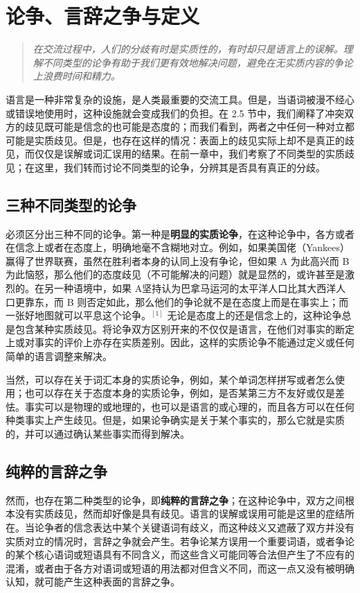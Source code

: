 \section{论争、言辞之争与定义}

\begin{quotation}
\textit{在交流过程中，人们的分歧有时是实质性的，有时却只是语言上的误解。理解不同类型的论争有助于我们更有效地解决问题，避免在无实质内容的争论上浪费时间和精力。}
\end{quotation}

语言是一种非常复杂的设施，是人类最重要的交流工具。但是，当语词被漫不经心或错误地使用时，这种设施就会变成我们的负担。在 2.5 节中，我们阐释了冲突双方的歧见既可能是信念的也可能是态度的；而我们看到，两者之中任何一种对立都可能是实质歧见。但是，也存在这样的情况：表面上的歧见实际上却不是真正的歧见，而仅仅是误解或词汇误用的结果。在前一章中，我们考察了不同类型的实质歧见；在这里，我们转而讨论不同类型的论争，分辨其是否具有真正的分歧。

\subsection{三种不同类型的论争}

必须区分出三种不同的论争。第一种是\textbf{明显的实质论争}，在这种论争中，各方或者在信念上或者在态度上，明确地毫不含糊地对立。例如，如果美国佬（Yankees）赢得了世界联赛，虽然在胜利者本身的认同上没有争论，但如果 A 为此高兴而 B 为此恼怒，那么他们的态度歧见（不可能解决的问题）就是显然的，或许甚至是激烈的。在另一种语境中，如果 A坚持认为巴拿马运河的太平洋人口比其大西洋人口更靠东，而 B 则否定如此，那么他们的争论就不是在态度上而是在事实上；而一张好地图就可以平息这个论争。$^{[1]}$ 无论是态度上的还是信念上的，这种论争总是包含某种实质歧见。将论争双方区别开来的不仅仅是语言，在他们对事实的断定上或对事实的评价上亦存在实质差别。因此，这样的实质论争不能通过定义或任何简单的语言调整来解决。

当然，可以存在关于词汇本身的实质论争，例如，某个单词怎样拼写或者怎么使用；也可以存在关于态度本身的实质论争，例如，是否某第三方不友好或仅是差怯。事实可以是物理的或地理的，也可以是语言的或心理的，而且各方可以在任何种类事实上产生歧见。但是，如果论争确实是关于某个事实的，那么它就是实质的，并可以通过确认某些事实而得到解决。

\subsection{纯粹的言辞之争}

然而，也存在第二种类型的论争，即\textbf{纯粹的言辞之争}；在这种论争中，双方之间根本没有实质歧见，然而却好像是具有歧见。语言的误解或误用可能是这里的症结所在。当论争者的信念表达中某个关键语词有歧义，而这种歧义又遮蔽了双方并没有实质对立的情况时，言辞之争就会产生。若争论某方误用一个重要词语，或者争论的某个核心语词或短语具有不同含义，而这些含义可能同等合法但产生了不应有的混淆，或者由于各方对语词或短语的用法都对但含义不同，而这一点又没有被明确认知，就可能产生这种表面的言辞之争。

